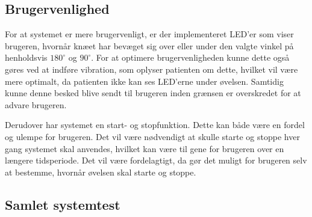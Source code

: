 \subsection{Brugervenlighed}
For at systemet er mere brugervenligt, er der implementeret LED'er som viser brugeren, hvornår knæet har bevæget sig over eller under den valgte vinkel på henholdsvis $180^{\circ}$ og $90^{\circ}$. For at optimere brugervenligheden kunne dette også gøres ved at indføre vibration, som oplyser patienten om dette, hvilket vil være mere optimalt, da patienten ikke kan ses LED'erne under øvelsen. Samtidig kunne denne besked blive sendt til brugeren inden grænsen er overskredet for at advare brugeren. 

Derudover har systemet en start- og stopfunktion. Dette kan både være en fordel og ulempe for brugeren. Det vil være nødvendigt at skulle starte og stoppe hver gang systemet skal anvendes, hvilket kan være til gene for brugeren over en længere tidsperiode. Det vil være fordelagtigt, da gør det muligt for brugeren selv at bestemme, hvornår øvelsen skal starte og stoppe.

\subsection{Samlet systemtest}